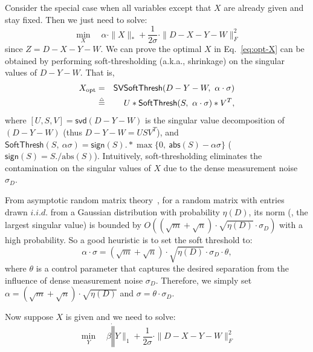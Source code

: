 Consider the special case when all variables except that $X$ are already
given and stay 
fixed. Then we just need to solve: %
\begin{equation}
\min_{X}\quad \alpha\cdot\|X\|_* +
\frac{1}{2\sigma}\cdot\|D-X-Y-W\|_F^2
\label{eq:opt-X}
\end{equation}
since $Z=D-X-Y-W$.
We can prove the optimal $X$ in Eq.~\eqref{eq:opt-X} can be
obtained by performing soft-thresholding (a.k.a., shrinkage) on the
singular values of $D-Y-W$.  That is, %
\begin{eqnarray}
X_{\mathrm{opt}}& = &\mathsf{SVSoftThresh}(D-Y-W,~\alpha\cdot\sigma)\notag\\
& \stackrel{\scriptscriptstyle{\triangle}}{=} &U*\mathsf{SoftThresh}(S,~\alpha\cdot\sigma)*V^T,\label{eq:X_opt}
\end{eqnarray}
where $[U,S,V] = \mathsf{svd}(D-Y-W)$ is the singular value
decomposition of $(D-Y-W)$ (thus $D-Y-W = U S V^T$), and
$\mathsf{SoftThresh}(S,~\alpha\sigma) = \mathsf{sign}(S) .*
\max\{0,~\mathsf{abs}(S)-\alpha\sigma\}$ ($\mathsf{sign}(S) =
S./\mathrm{abs}(S)$).  Intuitively, soft-thresholding eliminates the
contamination on the singular values of $X$ due to the dense
measurement noise $\sigma_D$.

From asymptotic random matrix theory~\cite{dneedell07norm}, for a
random matrix with entries drawn $i.i.d.$ from a Gaussian distribution
with probability $\eta(D)$, its norm (\ie, the largest singular value)
is bounded by $O((\sqrt{m}+\sqrt{n})\cdot\sqrt{\eta(D)}\cdot\sigma_D)$
with a high probability.  So a good heuristic is to set the soft
threshold to:
\[
\alpha\cdot\sigma =
(\sqrt{m}+\sqrt{n})\cdot\sqrt{\eta(D)}\cdot\sigma_D \cdot \theta,
\]
where $\theta$ is a control parameter that captures the desired
separation from the influence of dense measurement noise $\sigma_D$.
Therefore, we simply set
$\alpha=(\sqrt{m}+\sqrt{n})\cdot\sqrt{\eta(D)}$ and $\sigma=\theta
\cdot\sigma_D$.

Now suppose $X$ is given and we need to solve:
\begin{equation}
\min_Y\quad \beta\dot\|Y\|_1 + \frac{1}{2\sigma}\cdot \|D-X-Y-W\|_F^2 
\label{eq:opt-Y}
\end{equation}

